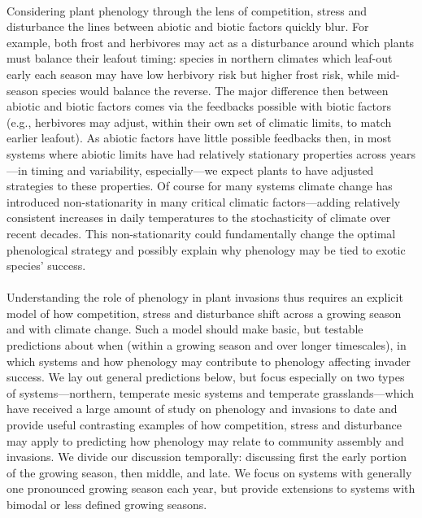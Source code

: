 \documentclass[11pt,a4paper,oneside]{article}
\begin{document}
\\ 
Considering plant phenology through the lens of competition, stress and disturbance the lines between abiotic and biotic factors quickly blur. For example, both frost and herbivores may act as a disturbance around which plants must balance their leafout timing: species in northern climates which leaf-out early each season may have low herbivory risk but higher frost risk, while mid-season species would balance the reverse. The major difference then between abiotic and biotic factors comes via the feedbacks possible with biotic factors (e.g., herbivores may adjust, within their own set of climatic limits, to match earlier leafout). As abiotic factors have little possible feedbacks then, in most systems where abiotic limits have had relatively stationary properties across years---in timing and variability, especially---we expect plants to have adjusted strategies to these properties. Of course for many systems climate change has introduced non-stationarity in many critical climatic factors---adding relatively consistent increases in daily temperatures to the stochasticity of climate over recent decades. This non-stationarity could fundamentally change the optimal phenological strategy and possibly explain why phenology may be tied to exotic species' success.\\
\\
Understanding the role of phenology in plant invasions thus requires an explicit model of how competition, stress and disturbance shift across a growing season and with climate change. Such a model should make basic, but testable predictions about when (within a growing season and over longer timescales), in which systems and how phenology may contribute to phenology affecting invader success. We lay out general predictions below, but focus especially on two types of systems---northern, temperate mesic systems and temperate grasslands---which have received a large amount of study on phenology and invasions to date and provide useful contrasting examples of how competition, stress and disturbance may apply to predicting how phenology may relate to community assembly and invasions. We divide our discussion temporally: discussing first the early portion of the growing season, then middle, and late. We focus on systems with generally one pronounced growing season each year, but provide extensions to systems with bimodal or less defined growing seasons.\\
\end{document}
